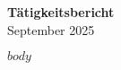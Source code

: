 \documentclass[a4paper]{article}
\begin{document}
\begin{center}
{\Huge \textbf{Tätigkeitsbericht}}\\[0.5cm]
{\LARGE September 2025}\\[1.5cm]
\end{center}

\newpage

$body$
\end{document}

